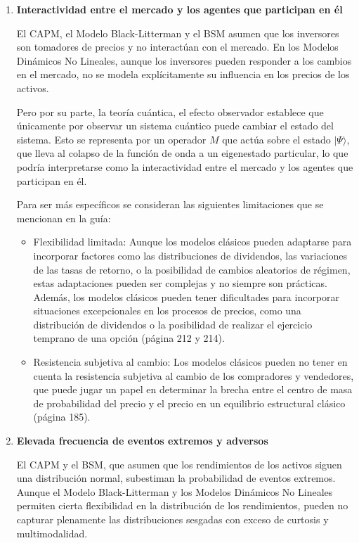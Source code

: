 \begin{problema}
\begin{sol}
\begin{enumerate}
    \item \textbf{Interactividad entre el mercado y los agentes que participan en él}
    
    El CAPM, el Modelo Black-Litterman y el BSM asumen que los inversores son tomadores de precios y no interactúan con el mercado. En los Modelos Dinámicos No Lineales, aunque los inversores pueden responder a los cambios en el mercado, no se modela explícitamente su influencia en los precios de los activos.\bigbreak
    
    Pero por su parte, la teoría cuántica, el efecto observador establece que únicamente por observar un sistema cuántico puede cambiar el estado del sistema. Esto se representa por un operador $M$ que actúa sobre el estado $|\Psi\rangle$, que lleva al colapso de la función de onda a un eigenestado particular, lo que podría interpretarse como la interactividad entre el mercado y los agentes que participan en él. 

    Para ser más específicos se consideran las siguientes limitaciones que se mencionan en la guía: 
    \begin{itemize}
        \item Flexibilidad limitada: Aunque los modelos clásicos pueden adaptarse para incorporar factores como las distribuciones de dividendos, las variaciones de las tasas de retorno, o la posibilidad de cambios aleatorios de régimen, estas adaptaciones pueden ser complejas y no siempre son prácticas. Además, los modelos clásicos pueden tener dificultades para incorporar situaciones excepcionales en los procesos de precios, como una distribución de dividendos o la posibilidad de realizar el ejercicio temprano de una opción (página 212 y 214).
        \item Resistencia subjetiva al cambio: Los modelos clásicos pueden no tener en cuenta la resistencia subjetiva al cambio de los compradores y vendedores, que puede jugar un papel en determinar la brecha entre el centro de masa de probabilidad del precio y el precio en un equilibrio estructural clásico (página 185).
    \end{itemize}
    
    \item \textbf{Elevada frecuencia de eventos extremos y adversos}
    
    El CAPM y el BSM, que asumen que los rendimientos de los activos siguen una distribución normal, subestiman la probabilidad de eventos extremos. Aunque el Modelo Black-Litterman y los Modelos Dinámicos No Lineales permiten cierta flexibilidad en la distribución de los rendimientos, pueden no capturar plenamente las distribuciones sesgadas con exceso de curtosis y multimodalidad.\bigbreak
    

\end{enumerate}
\end{sol}
\end{problema}
